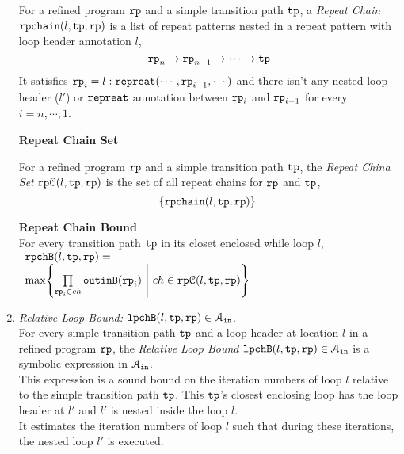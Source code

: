 \begin{enumerate}
\begin{defn}
  \label{def:repeatchain}
For a refined program ${\mathtt{rp}}$ and a simple transition path ${\mathtt{tp}}$,
a \emph{Repeat Chain} ${\mathtt{rpchain}}(l, {\mathtt{tp}}, {\mathtt{rp}})$
is a list of repeat patterns nested in a repeat pattern with loop header annotation $l$,
\[
 {\mathtt{rp}}_n \to {\mathtt{rp}}_{n-1} \to \cdots \to {\mathtt{tp}}
\]
It satisfies
 ${\mathtt{rp}}_{i}= l : {\mathtt{repreat}}(\cdots, {\mathtt{rp}}_{i - 1}, \cdots)$ and
 there isn't any nested loop header ($l'$) or ${\mathtt{repreat}}$ annotation between ${\mathtt{rp}}_{i}$ and ${\mathtt{rp}}_{i - 1}$
 for every $i = n, \cdots, 1$.
\end{defn}
%
\textbf{Repeat Chain Set}
\begin{defn}
  \label{def:repeatchainset}
  For a refined program ${\mathtt{rp}}$ and a simple transition path ${\mathtt{tp}}$, the \emph{Repeat China Set}
  ${\mathtt{rp}}\mathcal{C}(l, {\mathtt{tp}}, {\mathtt{rp}})$ is the set of 
  all repeat chains for ${\mathtt{rp}}$ and ${\mathtt{tp}}$,
  \[
    \left\{\rpch(l, \tpath, \rprog) \right\}.
 \]
\end{defn}
\textbf{Repeat Chain Bound}
\\
For every transition path ${\mathtt{tp}}$
in its closet enclosed while loop $l$,
  \\
  $
  \begin{array}{l}
    \rpchB(l, \tpath,  \rprog) = \\
    \max \left\{ \prod\limits_{\rprog_i \in ch}  \outinB(\rprog_i) 
  ~\middle\vert~ ch \in \rpchset(l, \tpath, \rprog) \right\}
  \end{array}
  $
  \\
  \item \emph{Relative Loop Bound:} ${\mathtt{lpchB}}(l, {\mathtt{tp}}, {\mathtt{rp}}) \in \mathcal{A}_{{\mathtt{in}}}$.
  \\
  For every simple transition path ${\mathtt{tp}}$
and a loop header at location $l$ in a refined program ${\mathtt{rp}}$,
the \emph{Relative Loop Bound} ${\mathtt{lpchB}}(l, {\mathtt{tp}}, {\mathtt{rp}}) \in \mathcal{A}_{{\mathtt{in}}}$ is a symbolic expression in $\mathcal{A}_{{\mathtt{in}}}$.
\\
This expression is a sound bound on the iteration numbers of loop $l$ relative to the simple transition path ${\mathtt{tp}}$.
This ${\mathtt{tp}}$'s closest enclosing loop has the loop header at $l'$ and $l'$ is nested inside the loop $l$.
\\
It estimates the iteration numbers of loop $l$ such that during these iterations, the nested loop $l'$ is executed.


\end{enumerate}
